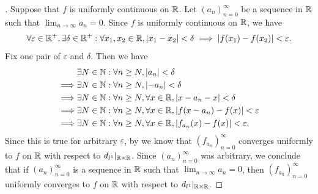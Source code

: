 \begin{proof}[]
  Suppose that \(f\) is uniformly continuous on \(\mathbb{R}\).
  Let \((a_n)_{n = 0}^\infty\) be a sequence in \(\mathbb{R}\) such that \(\lim_{n \to \infty} a_n = 0\).
  Since \(f\) is uniformly continuous on \(\mathbb{R}\), we have
  \[
    \forall \varepsilon \in \mathbb{R}^+, \exists \delta \in \mathbb{R}^+ : \forall x_1, x_2 \in \mathbb{R}, \left\lvert x_1 - x_2\right\rvert < \delta \implies \left\lvert f(x_1) - f(x_2)\right\rvert < \varepsilon.
  \]
  Fix one pair of \(\varepsilon\) and \(\delta\).
  Then we have
  \begin{align*}
             & \exists N \in \mathbb{N} : \forall n \geq N, \left\lvert a_n\right\rvert < \delta                                       \\
    \implies & \exists N \in \mathbb{N} : \forall n \geq N, \left\lvert-a_n\right\rvert < \delta                                      \\
    \implies & \exists N \in \mathbb{N} : \forall n \geq N, \forall x \in \mathbb{R}, \left\lvert x - a_n - x\right\rvert < \delta             \\
    \implies & \exists N \in \mathbb{N} : \forall n \geq N, \forall x \in \mathbb{R}, \left\lvert f(x - a_n) - f(x)\right\rvert < \varepsilon  \\
    \implies & \exists N \in \mathbb{N} : \forall n \geq N, \forall x \in \mathbb{R}, \left\lvert f_{a_n}(x) - f(x)\right\rvert < \varepsilon.
  \end{align*}
  Since this is true for arbitrary \(\varepsilon\), by  we know that \((f_{a_n})_{n = 0}^\infty\) converges uniformly to \(f\) on \(\mathbb{R}\) with respect to \(d_{l^1}|_{\mathbb{R} \times \mathbb{R}}\).
  Since \((a_n)_{n = 0}^\infty\) was arbitrary, we conclude that if \((a_n)_{n = 0}^\infty\) is a sequence in \(\mathbb{R}\) such that \(\lim_{n \to \infty} a_n = 0\), then \((f_{a_n})_{n = 0}^\infty\) uniformly converges to \(f\) on \(\mathbb{R}\) with respect to \(d_{l^1}|_{\mathbb{R} \times \mathbb{R}}\).


\end{proof}
